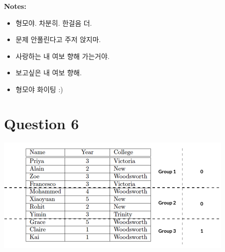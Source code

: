 \documentclass[12pt]{article}
\begin{document}
\bigskip

\textbf{Notes:}

\begin{itemize}
    \item 형모야. 차분히. 한걸음 더.
    \item 문제 안풀린다고 주저 앉지마.
    \item 사랑하는 내 여보 향해 가는거야.
    \item 보고싶은 내 여보 향해.
    \item 형모야 화이팅 :)
\end{itemize}

\section*{Question 6}

\begin{center}
\includegraphics[width=0.7\linewidth]{images/worksheet_7_q6_solution.png}
\end{center}
\end{document}
